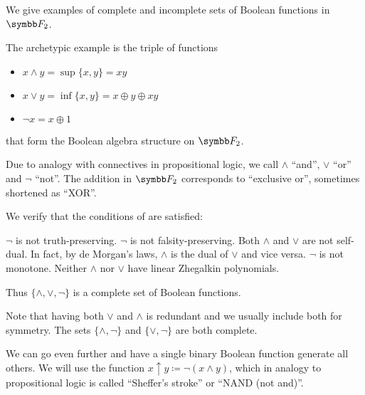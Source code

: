 \begin{example}\label{ex:posts_completeness_theorem}
  We give examples of complete and incomplete sets of Boolean functions in \( \BF_2 \).

  \begin{exenum}
     The archetypic example is the triple of functions
    \begin{itemize}
     \item \( x \land y = \sup \{ x, y \} = xy \)
     \item \( x \lor y = \inf \{ x, y \} = x \oplus y \oplus xy \)
     \item \( \neg x = x \oplus 1 \)
    \end{itemize}
    that form the Boolean algebra structure on \( \BF_2 \).

    Due to analogy with connectives in propositional logic, we call \( \land \) \enquote{and}, \( \lor \) \enquote{or} and \( \neg \) \enquote{not}. The addition in \( \BF_2 \) corresponds to \enquote{exclusive or}, sometimes shortened as \enquote{XOR}.

    We verify that the conditions of  are satisfied:
    \begin{description}
       \( \neg \) is not truth-preserving.
       \( \neg \) is not falsity-preserving.
       Both \( \land \) and \( \lor \) are not self-dual. In fact, by de Morgan's laws, \( \land \) is the dual of \( \lor \) and vice versa.
       \( \neg \) is not monotone.
       Neither \( \land \) nor \( \lor \) have linear Zhegalkin polynomials.
    \end{description}

    Thus \( \{ \land, \lor, \neg \} \) is a complete set of Boolean functions.

    Note that having both \( \lor \) and \( \land \) is redundant and we usually include both for symmetry. The sets \( \{ \land, \neg \} \) and \( \{ \lor, \neg \} \) are both complete.

     We can go even further and have a single binary Boolean function generate all others. We will use the function \( x \uparrow y \coloneqq \neg(x \land y) \), which in analogy to propositional logic is called \enquote{Sheffer's stroke} or \enquote{NAND (not and)}.


\end{exenum}
\end{example}

